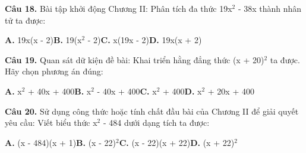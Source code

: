 \documentclass[11pt,a4paper]{article}
\begin{document}
\textbf{\color{primary} Câu 18.} Bài tập khởi động Chương II: Phân tích đa thức 19x$^2$ - 38x thành nhân tử ta được:\par
\hspace*{1.5em}\textbf{A.} 19x(x - 2)\quad\quad \textbf{B.} 19(x$^2$ - 2)\quad\quad \textbf{C.} x(19x - 2)\quad\quad \textbf{D.} 19x(x + 2)\par\vspace{2pt}
\textbf{\color{primary} Câu 19.} Quan sát dữ kiện đề bài: Khai triển hằng đẳng thức (x + 20)$^2$ ta được. Hãy chọn phương án đúng:\par
\hspace*{1.5em}\textbf{A.} x$^2$ + 40x + 400\quad\quad \textbf{B.} x$^2$ - 40x + 400\quad\quad \textbf{C.} x$^2$ + 400\quad\quad \textbf{D.} x$^2$ + 20x + 400\par\vspace{2pt}
\textbf{\color{primary} Câu 20.} Sử dụng công thức hoặc tính chất đầu bài của Chương II để giải quyết yêu cầu: Viết biểu thức x$^2$ - 484 dưới dạng tích ta được:\par
\hspace*{1.5em}\textbf{A.} (x - 484)(x + 1)\quad\quad \textbf{B.} (x - 22)$^2$\quad\quad \textbf{C.} (x - 22)(x + 22)\quad\quad \textbf{D.} (x + 22)$^2$\par\vspace{2pt}
\end{document}
